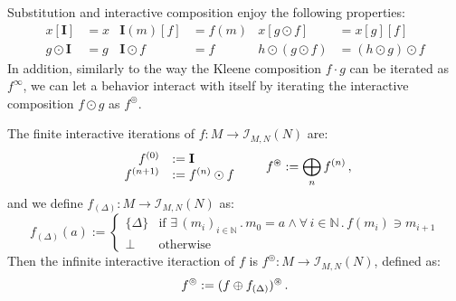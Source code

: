 \documentclass[acmsmall,timestamp,review,anonymous]{acmart}
\newcommand{\kw}[1]{\ensuremath{ \mathsf{#1} }}
\newcommand{\bind}{\gg\!\!=}
\begin{document}
%
%

Substitution and interactive composition
enjoy the following properties:
\begin{align*}
  x[\mathbf{I}] &= x &
  \mathbf{I}(m)[f] &= f(m) &
  x[g \odot f] &= x[g][f] \\
  g \odot \mathbf{I} &= g &
  \mathbf{I} \odot f &= f &
  h \odot (g \odot f) &= (h \odot g) \odot f
\end{align*}
In addition,
similarly to the way
the Kleene composition $f \cdot g$ can be iterated as $f^\infty$,
we can let a behavior interact with itself
by iterating the interactive composition $f \odot g$ as $f^\circledcirc$.

\begin{definition}
The finite interactive iterations
of $f : M \rightarrow \mathcal{I}_{M,N}(N)$
are:
\[
    \begin{array}{rl}
      f^{(0)} &:= \mathbf{I} \\
      f^{(n+1)} &:= f^{(n)} \odot f
    \end{array}
    \qquad
    f^\oast := \bigoplus_n f^{(n)} \,,
\]
and we define
$f_{(\Delta)} : M \rightarrow \mathcal{I}_{M,N}(N)$
as:
\[
    f_{(\Delta)}(a) :=
    \begin{cases}
      \{ \Delta \} &\mbox{if }
        \exists \, (m_i)_{i \in \mathbb{N}} \,.\,
        m_0 = a \wedge
        \forall \, i \in \mathbb{N} \,.\,
        f(m_i) \ni m_{i+1} \\
      \bot &\mbox{otherwise}
    \end{cases}
\]
Then the infinite interactive iteraction of $f$ is
$f^\circledcirc : M \rightarrow \mathcal{I}_{M,N}(N)$, defined as:
\[
    f^\circledcirc := (f \oplus f_{(\Delta)})^\oast \,.
\]
\end{definition}
\end{document}
